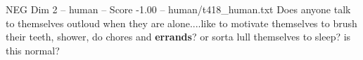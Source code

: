 \begin{textsample}{NEG Dim 2 – human – Score -1.00 – human/t418\_human.txt}  \label{ex:f2_neg_021}
Does anyone talk to themselves outloud when they are alone....like to motivate themselves to brush their teeth, shower, do chores and \textbf{errands}? or sorta lull themselves to sleep? is this normal?

\end{textsample}
